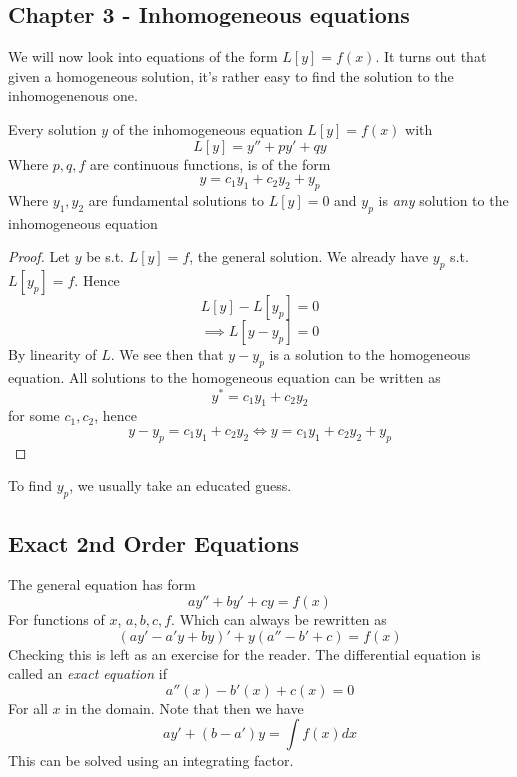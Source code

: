 \subsection{Chapter 3 - Inhomogeneous equations}
We will now look into equations of the form $L[y]=f(x)$. It turns out that given a
homogeneous solution, it's rather easy to find the solution to the inhomogenenous one.
\begin{theorem}
  Every solution $y$ of the inhomogeneous equation $L[y]=f(x)$ with
  \[L[y]=y'' + py' + qy\]
  Where $p,q,f$ are continuous functions, is of the form
  \[y = c_1y_1 + c_2y_2 + y_p\]
  Where $y_1,y_2$ are fundamental solutions to $L[y]=0$ and $y_p$ is \emph{any} solution
  to the inhomogeneous equation
\end{theorem}
\begin{proof}
  Let $y$ be s.t. $L[y]=f$, the general solution. We already have $y_p$ s.t. $L[y_p]=f$. Hence
  \[L[y]-L[y_p]=0\]
  \[\implies L[y-y_p]=0\]
  By linearity of $L$. We see then that $y-y_p$ is a solution to the homogeneous equation.
  All solutions to the homogeneous equation can be written as 
  \[y^*=c_1 y_1 + c_2 y_2 \]
  for some $c_1, c_2$, hence
  \[y-y_p = c_1 y_1 + c_2 y_2 \iff y = c_1 y_1 + c_2 y_2 + y_p\]
\end{proof}
To find $y_p$, we usually take an educated guess.

\subsection{Exact 2nd Order Equations}
The general equation has form
\[a y'' + by' + cy = f(x)\]
For functions of $x$, $a,b,c,f$. Which can always be rewritten as
\[(ay' -a'y + by)' + y(a''-b'+c) = f(x)\]
Checking this is left as an exercise for the reader. The differential equation is called
an \emph{exact equation} if 
\[a''(x) -b'(x) +c(x) =0\]
For all $x$ in the domain. Note that then we have
\[ay'+ (b-a')y = \int f(x) dx\]
This can be solved using an integrating factor.

